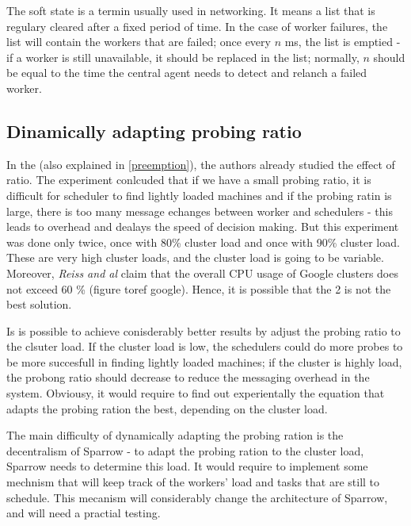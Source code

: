 \documentclass[11pt]{article}
\begin{document}
		The soft state is a termin usually used in networking. It means a list that is regulary cleared after a fixed period of time. In the case of worker failures, the list will contain the workers that are failed; once every $n$ ms, the list is emptied - if a worker is still unavailable, it should be replaced in the list; normally, $n$ should be equal to the time the central agent needs to detect and relanch a failed worker.
	
	\subsection{Dinamically adapting probing ratio}
	
		In the \cite[subsection 7.9]{sparrow} (also explained in \ref{preemption}), the authors already studied the effect of ratio. The experiment conlcuded that if we have a small probing ratio, it is difficult for scheduler to find lightly loaded machines and if the probing ratin is large, there is too many message echanges between worker and schedulers - this leads to overhead and dealays the speed of decision making. But this experiment was done only twice, once with 80\% cluster load and once with 90\% cluster load. These are very high cluster loads, and the cluster load is going to be variable. Moreover, \textit{Reiss and al} \cite{hetero} claim that the overall CPU usage of Google clusters does not exceed 60 \% (figure toref google). Hence, it is possible that the 2 is not the best solution.
		
		Is is possible to achieve conisderably better results by adjust the probing ratio to the clsuter load. If the cluster load is low, the schedulers could do more probes to be more succesfull in finding lightly loaded machines; if the cluster is highly load, the probong ratio should decrease to reduce the messaging overhead in the system. Obviousy, it would require to find out experientally the equation that adapts the probing ration the best, depending on the cluster load.
		
		The main difficulty of dynamically adapting the probing ration is the decentralism of Sparrow - to adapt the probing ration to the cluster load, Sparrow needs to determine this load. It would require to implement some mechnism that will keep track of the workers' load and tasks that are still to schedule. This mecanism will considerably change the architecture of Sparrow, and will need a practial testing.
		
\end{document}
